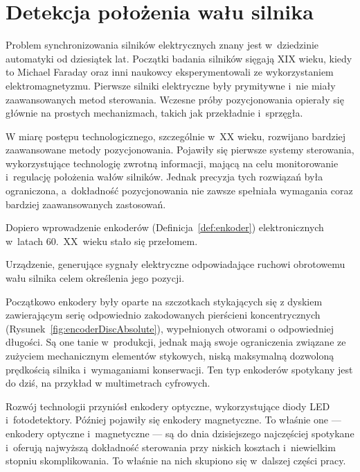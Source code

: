 \section{Detekcja położenia wału silnika}
\label{ch:analizaenkodery}

Problem synchronizowania silników elektrycznych znany jest w~dziedzinie automatyki od dziesiątek lat. Początki badania silników sięgają XIX wieku, kiedy to Michael Faraday oraz inni naukowcy eksperymentowali ze wykorzystaniem elektromagnetyzmu\cite{bib:pierwszesilniki}. Pierwsze silniki elektryczne były prymitywne i~nie miały zaawansowanych metod sterowania. Wczesne próby pozycjonowania opierały się głównie na prostych mechanizmach, takich jak przekładnie i~sprzęgła.

W miarę postępu technologicznego, szczególnie w~XX wieku, rozwijano bardziej zaawansowane metody pozycjonowania. Pojawiły się pierwsze systemy sterowania, wykorzystujące technologię zwrotną informacji, mającą na celu monitorowanie i~regulację położenia wałów silników. Jednak precyzja tych rozwiązań była ograniczona, a~dokładność pozycjonowania nie zawsze spełniała wymagania coraz bardziej zaawansowanych zastosowań.

Dopiero wprowadzenie enkoderów (Definicja~\ref{def:enkoder}) elektronicznych w~latach 60.~XX~wieku\cite{bib:pierwszeenkodery} stało się przełomem.

\begin{Definition}\label{def:enkoder}
    Urządzenie, generujące sygnały elektryczne odpowiadające ruchowi obrotowemu wału silnika celem określenia jego pozycji. 
\end{Definition}

Początkowo enkodery były oparte na szczotkach stykających się z dyskiem zawierającym serię odpowiednio zakodowanych pierścieni koncentrycznych (Rysunek~\ref{fig:encoderDiscAbsolute}), wypełnionych otworami o odpowiedniej długości\cite{bib:rodzajeenkoderow}. Są one tanie w~produkcji, jednak mają swoje ograniczenia związane ze zużyciem mechanicznym elementów stykowych, niską maksymalną dozwoloną prędkością silnika i~wymaganiami konserwacji. Ten typ enkoderów spotykany jest do dziś, na przykład w multimetrach cyfrowych.

Rozwój technologii przyniósł enkodery optyczne, wykorzystujące diody LED i~fotodetektory. Później pojawiły się enkodery magnetyczne. To właśnie one --- enkodery optyczne i~magnetyczne --- są do dnia dzisiejszego najczęściej spotykane i~oferują najwyższą dokładność sterowania przy niskich kosztach i~niewielkim stopniu skomplikowania. To właśnie na nich skupiono się w~dalszej części pracy.

